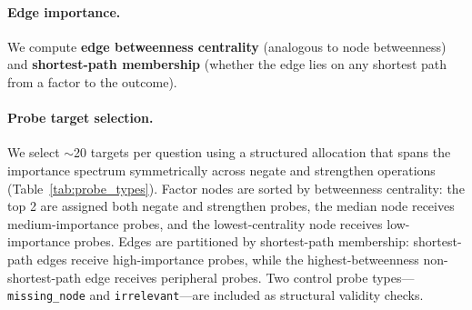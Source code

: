 \documentclass[11pt]{article}
\begin{document}
\paragraph{Edge importance.} We compute \textbf{edge betweenness centrality} (analogous to node betweenness) and \textbf{shortest-path membership} (whether the edge lies on any shortest path from a factor to the outcome).

\paragraph{Probe target selection.} We select ${\sim}$20 targets per question using a structured allocation that spans the importance spectrum symmetrically across negate and strengthen operations (Table~\ref{tab:probe_types}). Factor nodes are sorted by betweenness centrality: the top 2 are assigned both negate and strengthen probes, the median node receives medium-importance probes, and the lowest-centrality node receives low-importance probes. Edges are partitioned by shortest-path membership: shortest-path edges receive high-importance probes, while the highest-betweenness non-shortest-path edge receives peripheral probes. Two control probe types---\texttt{missing\_node} and \texttt{irrelevant}---are included as structural validity checks.
\end{document}
